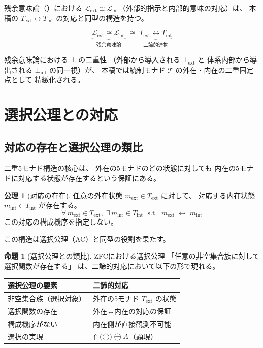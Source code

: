 \documentclass[11pt,a4paper]{article}
\newcommand{\MT}{\mathcal{T}}
\newcommand{\Text}{T_{\mathrm{ext}}}
\newcommand{\Tint}{T_{\mathrm{int}}}
\newcommand{\Lhagma}{\mathcal{L}}
\newcommand{\lext}{\Lhagma_{\mathrm{ext}}}
\newcommand{\lint}{\Lhagma_{\mathrm{int}}}
\theoremstyle{definition}
\newtheorem{axiom}{公理}[section]
\newtheorem{proposition}{命題}[section]
\begin{document}
残余意味論（\cite{Chiba2026semantics}）における
$\lext \cong \lint$（外部的指示と内部的意味の対応）は、
本稿の $\Text \leftrightarrow \Tint$ の対応と同型の構造を持つ。

\begin{equation}
  \underbrace{\lext \cong \lint}_{\text{残余意味論}}
  \;\cong\;
  \underbrace{\Text \leftrightarrow \Tint}_{\text{二諦的連携}}
\end{equation}

残余意味論における $\bot$ の二重性
（外部から導入される $\bot_{\mathrm{ext}}$ と
体系内部から導出される $\bot_{\mathrm{int}}$ の同一視）が、
本稿では統制モナド $\MT$ の外在・内在の二重固定点として
精緻化される。

\section{選択公理との対応}

\subsection{対応の存在と選択公理の類比}

二重5モナド構造の核心は、
外在の5モナドのどの状態に対しても
内在の5モナドに対応する状態が存在するという保証にある。

\begin{axiom}[対応の存在]
任意の外在状態 $m_{\mathrm{ext}} \in \Text$ に対して、
対応する内在状態 $m_{\mathrm{int}} \in \Tint$ が存在する。
\begin{equation}
  \forall\, m_{\mathrm{ext}} \in \Text,\;
  \exists\, m_{\mathrm{int}} \in \Tint \;\text{ s.t. }\;
  m_{\mathrm{ext}} \;\leftrightarrow\; m_{\mathrm{int}}
\end{equation}
この対応の構成機序を指定しない。
\end{axiom}

この構造は選択公理（AC）と同型の役割を果たす。

\begin{proposition}[選択公理との類比]
ZFCにおける選択公理
「任意の非空集合族に対して選択関数が存在する」
は、二諦的対応において以下の形で現れる。

\begin{center}
\begin{tabular}{ll}
\hline
\textbf{選択公理の要素} & \textbf{二諦的対応} \\
\hline
非空集合族（選択対象） & 外在の5モナド $\Text$ の状態 \\
選択関数の存在 & 外在↔内在の対応の保証 \\
構成機序がない & 内在側が直接観測不可能 \\
選択の実現 & $\metanegation(\dfix) \mweq A$（顕現） \\
\hline
\end{tabular}
\end{center}
\end{proposition}
\end{document}
